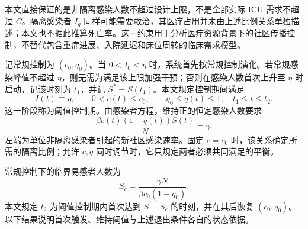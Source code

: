 \documentclass[lang=cn,a4paper,newtx]{elegantpaper}
\numberwithin{equation}{section}
\theoremstyle{plain}
\begin{document}
本文直接保证的是非隔离感染人数不超过设计上限，不是全部实际 ICU 需求不超过 $C$。隔离感染者 $I_q$ 同样可能需要救治，其医疗占用并未由上述比例关系单独描述；本文也不据此推算死亡率。这一约束用于分析医疗资源背景下的社区传播控制，不替代包含重症进展、入院延迟和床位周转的临床需求模型。

记常规控制为 $(c_0,q_0)$。当 $0<I_0<\eta$ 时，系统首先按常规控制演化。若常规感染峰值不超过 $\eta$，则无需为满足该上限加强干预；否则在感染人数首次上升至 $\eta$ 时启动，记该时刻为 $t_1$，并记 $S^*=S(t_1)$。本文规定控制期间满足
\begin{equation}
I(t)\equiv\eta,\qquad 0<c(t)\le c_0,\qquad q_0\le q(t)\le1,
\quad t_1\le t\le t_2.
\label{eq:model:plateau-requirement}
\end{equation}
这一阶段称为阈值控制期。由感染者方程，维持正的恒定感染人数要求
\begin{equation}
\frac{\beta c(t)(1-q(t))S(t)}{N}=\gamma.
\label{eq:model:balance}
\end{equation}
左端为单位非隔离感染者引起的新社区感染速率。固定 $c=c_0$ 时，该关系确定所需的隔离比例；允许 $c,q$ 同时调节时，它只规定两者必须共同满足的平衡。

常规控制下的临界易感者人数为
\begin{equation}
S_c=\frac{\gamma N}{\beta c_0(1-q_0)}.
\label{eq:model:Sc}
\end{equation}
本文规定 $t_2$ 为阈值控制期内首次达到 $S=S_c$ 的时刻，并在其后恢复 $(c_0,q_0)$。以下结果说明首次触发、维持阈值与上述退出条件各自的状态依据。
\end{document}
